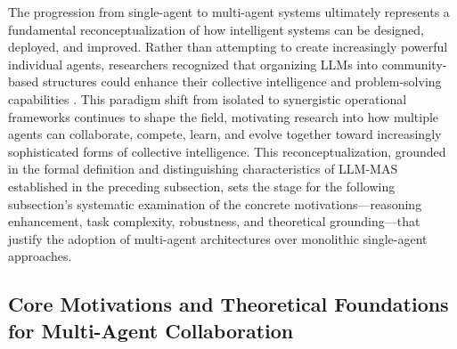 \documentclass[11pt]{article}
\begin{document}
The progression from single-agent to multi-agent systems ultimately represents a fundamental reconceptualization of how intelligent systems can be designed, deployed, and improved. Rather than attempting to create increasingly powerful individual agents, researchers recognized that organizing LLMs into community-based structures could enhance their collective intelligence and problem-solving capabilities \cite{ref22}. This paradigm shift from isolated to synergistic operational frameworks continues to shape the field, motivating research into how multiple agents can collaborate, compete, learn, and evolve together toward increasingly sophisticated forms of collective intelligence. This reconceptualization, grounded in the formal definition and distinguishing characteristics of LLM-MAS established in the preceding subsection, sets the stage for the following subsection's systematic examination of the concrete motivations---reasoning enhancement, task complexity, robustness, and theoretical grounding---that justify the adoption of multi-agent architectures over monolithic single-agent approaches.

\subsection{Core Motivations and Theoretical Foundations for Multi-Agent Collaboration}
\end{document}
